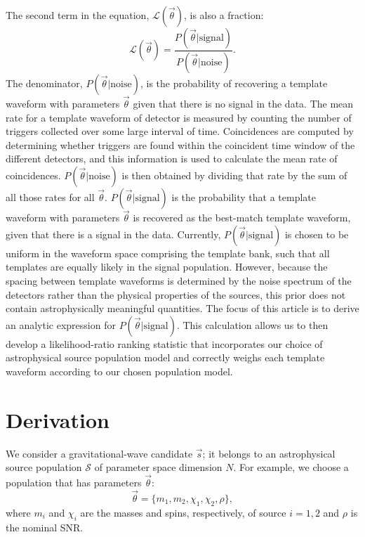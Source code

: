 \documentclass[twocolumn,showpacs,unsortedaddress,superscriptaddress,showkeys,nofootinbib,preprintnumbers,letterpaper]{revtex4-1}
\begin{document}
The second term in the equation, $\mathcal{L}(\vec{\theta})$, is also a fraction:
	\begin{equation}
	\mathcal{L}(\vec{\theta}) = \frac{P(\vec{\theta}|\text{signal})}{P(\vec{\theta}|\text{noise})}.
	\label{eqn:L_theta}
	\end{equation}
The denominator, $P(\vec{\theta}|\text{noise})$, is the probability of recovering a template waveform with parameters $\vec{\theta}$ given that there is no signal in the data. The mean rate for a template waveform of detector is measured by counting the number of triggers collected over some large interval of time. Coincidences are computed by determining whether triggers are found within the coincident time window of the different detectors, and this information is used to calculate the mean rate of coincidences. $P(\vec{\theta}|\text{noise})$ is then obtained by dividing that rate by the sum of all those rates for all $\vec\theta$. 
$P(\vec{\theta}|\text{signal})$ is the probability that a template waveform with parameters $\vec{\theta}$ is recovered as the best-match template waveform, given that there is a signal in the data. Currently, $P(\vec{\theta}|\text{signal})$ is chosen to be uniform in the waveform space comprising the template bank, such that all templates are equally likely in the signal population. However, because the spacing between template waveforms is determined by the noise spectrum of the detectors rather than the physical properties of the sources, this prior does not contain astrophysically meaningful quantities. The focus of this article is to derive an analytic expression for $P(\vec{\theta}|\text{signal})$. This calculation allows us to then develop a likelihood-ratio ranking statistic that incorporates our choice of astrophysical source population model and correctly weighs each template waveform according to our chosen population model. 


\section{Derivation} \label{sec:derivation}

We consider a gravitational-wave candidate $\vec{s}$; it belongs to an astrophysical source population $\mathcal{S}$ of parameter space dimension $N$. For example, we choose a population that has parameters $\vec\theta$:
   \begin{equation}
   \vec\theta = \{m_1,m_2,\chi_1,\chi_2,\rho\},
   \label{eqn:theta}
   \end{equation}
where $m_i$ and $\chi_i$ are the masses and spins, respectively, of source $i=1,2$ and $\rho$ is the nominal SNR.
\end{document}

